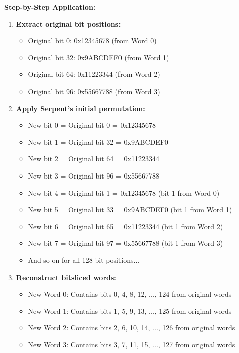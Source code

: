 \documentclass[12pt,a4paper]{article}
\begin{document}
\textbf{Step-by-Step Application:}
\begin{enumerate}
    \item \textbf{Extract original bit positions:}
    \begin{itemize}
        \item Original bit 0: 0x12345678 (from Word 0)
        \item Original bit 32: 0x9ABCDEF0 (from Word 1)
        \item Original bit 64: 0x11223344 (from Word 2)
        \item Original bit 96: 0x55667788 (from Word 3)
    \end{itemize}
    
    \item \textbf{Apply Serpent's initial permutation:}
    \begin{itemize}
        \item New bit 0 = Original bit 0 = 0x12345678
        \item New bit 1 = Original bit 32 = 0x9ABCDEF0
        \item New bit 2 = Original bit 64 = 0x11223344
        \item New bit 3 = Original bit 96 = 0x55667788
        \item New bit 4 = Original bit 1 = 0x12345678 (bit 1 from Word 0)
        \item New bit 5 = Original bit 33 = 0x9ABCDEF0 (bit 1 from Word 1)
        \item New bit 6 = Original bit 65 = 0x11223344 (bit 1 from Word 2)
        \item New bit 7 = Original bit 97 = 0x55667788 (bit 1 from Word 3)
        \item And so on for all 128 bit positions...
    \end{itemize}
    
    \item \textbf{Reconstruct bitsliced words:}
    \begin{itemize}
        \item New Word 0: Contains bits 0, 4, 8, 12, ..., 124 from original words
        \item New Word 1: Contains bits 1, 5, 9, 13, ..., 125 from original words
        \item New Word 2: Contains bits 2, 6, 10, 14, ..., 126 from original words
        \item New Word 3: Contains bits 3, 7, 11, 15, ..., 127 from original words
    \end{itemize}
    

\end{enumerate}
\end{document}

